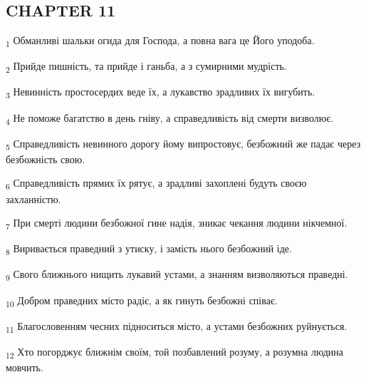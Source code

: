 \subsection{CHAPTER 11}
\begin{tcolorbox}
\textsubscript{1} Обманливі шальки огида для Господа, а повна вага це Його уподоба.
\end{tcolorbox}
\begin{tcolorbox}
\textsubscript{2} Прийде пишність, та прийде і ганьба, а з сумирними мудрість.
\end{tcolorbox}
\begin{tcolorbox}
\textsubscript{3} Невинність простосердих веде їх, а лукавство зрадливих їх вигубить.
\end{tcolorbox}
\begin{tcolorbox}
\textsubscript{4} Не поможе багатство в день гніву, а справедливість від смерти визволює.
\end{tcolorbox}
\begin{tcolorbox}
\textsubscript{5} Справедливість невинного дорогу йому випростовує, безбожний же падає через безбожність свою.
\end{tcolorbox}
\begin{tcolorbox}
\textsubscript{6} Справедливість прямих їх рятує, а зрадливі захоплені будуть своєю захланністю.
\end{tcolorbox}
\begin{tcolorbox}
\textsubscript{7} При смерті людини безбожної гине надія, зникає чекання людини нікчемної.
\end{tcolorbox}
\begin{tcolorbox}
\textsubscript{8} Виривається праведний з утиску, і замість нього безбожний іде.
\end{tcolorbox}
\begin{tcolorbox}
\textsubscript{9} Свого ближнього нищить лукавий устами, а знанням визволяються праведні.
\end{tcolorbox}
\begin{tcolorbox}
\textsubscript{10} Добром праведних місто радіє, а як гинуть безбожні співає.
\end{tcolorbox}
\begin{tcolorbox}
\textsubscript{11} Благословенням чесних підноситься місто, а устами безбожних руйнується.
\end{tcolorbox}
\begin{tcolorbox}
\textsubscript{12} Хто погорджує ближнім своїм, той позбавлений розуму, а розумна людина мовчить.
\end{tcolorbox}
